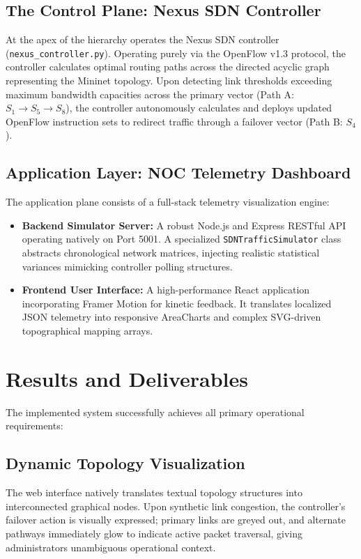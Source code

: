 \documentclass[12pt,a4paper]{article}
\begin{document}
\subsection{The Control Plane: Nexus SDN Controller}
At the apex of the hierarchy operates the Nexus SDN controller (\texttt{nexus\_controller.py}). Operating purely via the OpenFlow v1.3 protocol, the controller calculates optimal routing paths across the directed acyclic graph representing the Mininet topology. Upon detecting link thresholds exceeding maximum bandwidth capacities across the primary vector (Path A: $S_1 \rightarrow S_5 \rightarrow S_8$), the controller autonomously calculates and deploys updated OpenFlow instruction sets to redirect traffic through a failover vector (Path B: $S_4$).

\subsection{Application Layer: NOC Telemetry Dashboard}
The application plane consists of a full-stack telemetry visualization engine:
\begin{itemize}
    \item \textbf{Backend Simulator Server:} A robust Node.js and Express RESTful API operating natively on Port 5001. A specialized \texttt{SDNTrafficSimulator} class abstracts chronological network matrices, injecting realistic statistical variances mimicking controller polling structures.
    \item \textbf{Frontend User Interface:} A high-performance React application incorporating Framer Motion for kinetic feedback. It translates localized JSON telemetry into responsive AreaCharts and complex SVG-driven topographical mapping arrays.
\end{itemize}

\section{Results and Deliverables}
The implemented system successfully achieves all primary operational requirements:

\subsection{Dynamic Topology Visualization}
The web interface natively translates textual topology structures into interconnected graphical nodes. Upon synthetic link congestion, the controller’s failover action is visually expressed; primary links are greyed out, and alternate pathways immediately glow to indicate active packet traversal, giving administrators unambiguous operational context.
\end{document}
